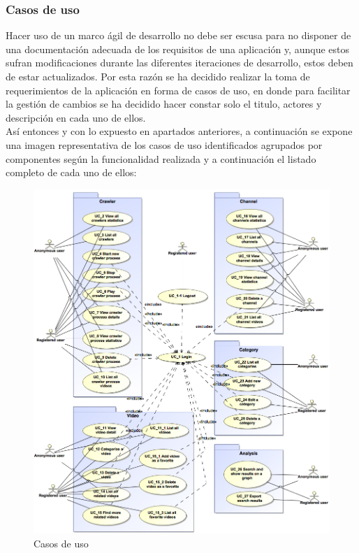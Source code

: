 \documentclass[11pt,a4paper]{article}
\begin{document}
\subsubsection{Casos de uso}\label{casosDeUso} 
Hacer uso de un marco ágil de desarrollo no debe ser escusa para no disponer de una documentación adecuada de los requisitos de una aplicación y, aunque estos sufran modificaciones durante las diferentes iteraciones de desarrollo, estos deben de estar actualizados. Por esta razón se ha decidido realizar la toma de requerimientos de la aplicación en forma de casos de uso, en donde para facilitar la gestión de cambios se ha decidido hacer constar solo el titulo, actores y descripción en cada uno de ellos.
\\

Así entonces y con lo expuesto en apartados anteriores, a continuación se expone una imagen representativa de los casos de uso identificados agrupados por componentes según la funcionalidad realizada y a continuación el listado completo de cada uno de ellos:

\begin{figure}[H]
\centering
\includegraphics[scale=0.35]{requisitos/UseCases.png}
\caption{Casos de uso}
\end{figure}
\medskip 
\medskip 
\end{document}
